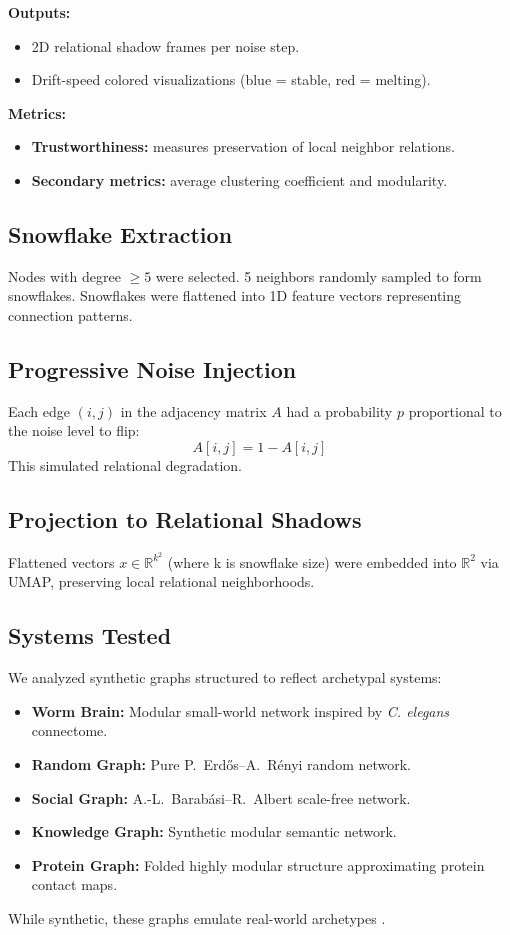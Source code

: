 \documentclass[conference]{IEEEtran}
\begin{document}
\textbf{Outputs:}
\begin{itemize}
    \item 2D relational shadow frames per noise step.
    \item Drift-speed colored visualizations (blue = stable, red = melting).
\end{itemize}

\textbf{Metrics:}
\begin{itemize}
    \item \textbf{Trustworthiness:} measures preservation of local neighbor relations.
    \item \textbf{Secondary metrics:} average clustering coefficient and modularity.
\end{itemize}

\subsection{Snowflake Extraction}
Nodes with degree $\geq 5$ were selected. 5 neighbors randomly sampled to form snowflakes. Snowflakes were flattened into 1D feature vectors representing connection patterns.

\subsection{Progressive Noise Injection}
Each edge $(i,j)$ in the adjacency matrix $A$ had a probability $p$ proportional to the noise level to flip:
\[
A[i,j] = 1 - A[i,j]
\]
This simulated relational degradation.

\subsection{Projection to Relational Shadows}
Flattened vectors $x \in \mathbb{R}^{k^2}$ (where k is snowflake size) were embedded into $\mathbb{R}^2$ via UMAP, preserving local relational neighborhoods.

\subsection{Systems Tested}
We analyzed synthetic graphs structured to reflect archetypal systems:
\begin{itemize}
    \item \textbf{Worm Brain:} Modular small-world network inspired by \textit{C. elegans} connectome.
    \item \textbf{Random Graph:} Pure P.~Erd\H{o}s--A.~R\'enyi random network.
    \item \textbf{Social Graph:} A.-L.~Barab\'asi--R.~Albert scale-free network.
    \item \textbf{Knowledge Graph:} Synthetic modular semantic network.
    \item \textbf{Protein Graph:} Folded highly modular structure approximating protein contact maps.
\end{itemize}
While synthetic, these graphs emulate real-world archetypes \cite{sporns,newman,barabasi_albert}.
\end{document}
